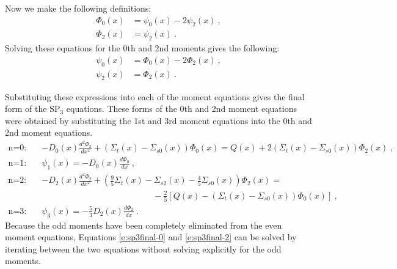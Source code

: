 Now we make the following definitions:
\begin{subequations}
  \begin{align}
  \Phi_0\left(x\right) &= \psi_0\left(x\right) - 2\psi_2\left(x\right)\ , \\
  \Phi_2\left(x\right) &= \psi_2\left(x\right)\ .
  \end{align}
\end{subequations}
Solving these equations for the 0th and 2nd moments gives the following:
\begin{subequations}
  \begin{align}
  \psi_0\left(x\right) &= \Phi_0\left(x\right) - 2\Phi_2\left(x\right)\ , \\
  \psi_2\left(x\right) &= \Phi_2\left(x\right)\ .
  \end{align}
\end{subequations}

Substituting these expressions into each of the moment equations gives the final form of the SP$_3$ equations.  These forms of the 0th and 2nd moment equations were obtained by substituting the 1st and 3rd moment equations into the 0th and 2nd moment equations.
\begin{subequations}
  \begin{align}
  \text{n=0:}\quad & -D_0\left(x\right) \frac{d^2\Phi_2}{dx^2} + \left(\Sigma_t\left(x\right) - \Sigma_{s0}\left(x\right)\right)\Phi_0\left(x\right) = Q\left(x\right) + 2\left(\Sigma_t\left(x\right) - \Sigma_{s0}\left(x\right)\right)\Phi_2\left(x\right)\ , \label{e:sp3final-0}\\
  \text{n=1:}\quad & \psi_1\left(x\right) = -D_0\left(x\right) \frac{d\Phi_0}{dx}\ , \label{e:sp3final-1} \\
  \text{n=2:}\quad & -D_2\left(x\right) \frac{d^2\Phi_2}{dx^2} + \left(\frac{9}{5}\Sigma_t\left(x\right) - \Sigma_{s2}\left(x\right) - \frac{4}{5}\Sigma_{s0}\left(x\right)\right)\Phi_2\left(x\right) = \nonumber \\ &\quad\quad\quad\quad\quad\quad\quad\quad\quad\quad\quad\quad\quad -\frac{2}{5}\left[Q\left(x\right) - \left(\Sigma_t\left(x\right) - \Sigma_{s0}\left(x\right)\right)\Phi_0\left(x\right)\right]\ , \label{e:sp3final-2} \\
  \text{n=3:}\quad & \psi_3\left(x\right) = -\frac{5}{3}D_2\left(x\right)\frac{d\Phi_2}{dx}\ . \label{e:sp3final-3}
  \end{align}
\end{subequations}
Because the odd moments have been completely eliminated from the even moment equations, Equations \ref{e:sp3final-0} and \ref{e:sp3final-2} can be solved by iterating between the two equations without solving explicitly for the odd moments.

